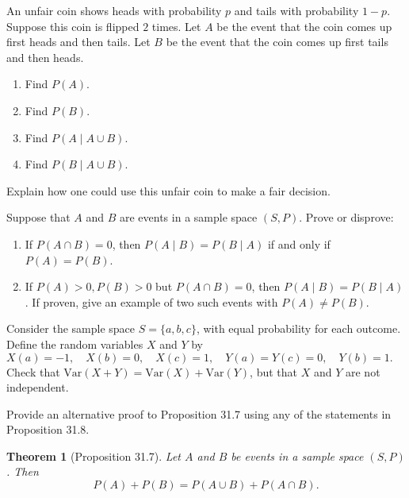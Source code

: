 \documentclass{article}
\newtheorem*{theorem}{Theorem}
\theoremstyle{definition}
\begin{document}
\begin{question}
    An unfair coin shows heads with probability $p$ and tails with probability
    $1-p$. Suppose this coin is flipped $2$ times. Let $A$ be the event that the coin comes up first heads and
    then tails.  Let $B$ be the event that the coin comes up first tails and
    then heads.
    \begin{enumerate}
        \item  Find $P(A)$.
        \item  Find $P(B)$.
        \item  Find $P(A \mid A \cup B)$.
        \item  Find $P(B \mid A \cup B)$.
    \end{enumerate}
    Explain how one could use this unfair coin to make a fair decision.
\end{question}
\begin{solution}
\end{solution}

\begin{question}
    Suppose that $A$ and $B$ are events in a sample space $(S,P)$.
    Prove or disprove:
    \begin{enumerate}
        \item If $P(A \cap B)=0$, then $P(A\mid B)=P(B\mid A)$ if and only
            if $P(A)=P(B)$.
        \item If $P(A)>0, P(B)>0$ but $P(A \cap B)=0$, then $P(A\mid
            B)=P(B\mid A)$.  If proven, give an example of two such events
            with $P(A) \ne P(B)$.
    \end{enumerate}
\end{question}
\begin{solution}
\end{solution}

\begin{question}
    Consider the sample space $S = \{ a, b, c \}$, with equal probability for each outcome. Define the random variables $X$ and  
    $Y$ by $X(a) = -1, \quad X(b) = 0, \quad X(c) = 1, \quad Y(a) = Y(c) = 0, \quad Y(b) = 1.$ 
    Check that $\mathrm{Var}(X+Y) = \mathrm{Var}(X) + \mathrm{Var}(Y)$, but that $X$ and $Y$ are not independent.
\end{question}
\begin{solution}
\end{solution}

\begin{question}
    Provide an alternative proof to Proposition 31.7 using any of the statements in Proposition 31.8.
    \begin{theorem}[Proposition 31.7]
    Let $A$ and $B$ be events in a sample space $(S, P)$. Then 
    \[ P(A) + P(B) = P(A\cup B) + P(A\cap B).\]
    \end{theorem}
\end{question}
\begin{solution}
\end{solution}
\end{document}
